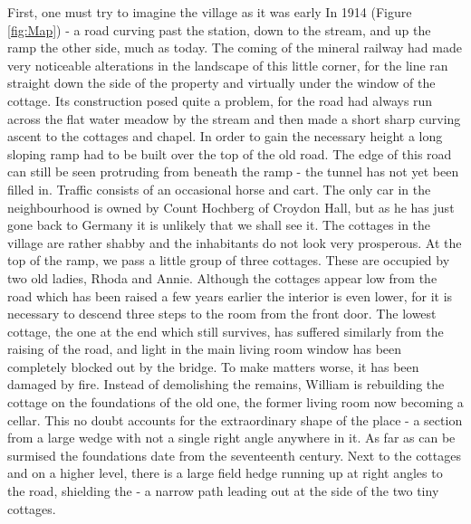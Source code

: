 
First, one must try to imagine the village as it was early In 1914 (Figure \ref{fig:Map}) - a road curving past the station, down to the stream, and up the ramp the other side, much as today. The coming of the mineral railway had made very noticeable alterations in the landscape of this little corner, for the line ran straight down the side of the property and virtually under the window of the cottage. Its construction posed quite a problem, for the road had always run across the flat water meadow by the stream and then made a short sharp curving ascent to the cottages and chapel. In order to gain the necessary height a long sloping ramp had to be built over the top of the old road. The edge of this road can still be seen protruding from beneath the ramp - the tunnel has not yet been filled in. Traffic consists of an occasional horse and cart. The only car in the neighbourhood is owned by Count Hochberg of Croydon Hall, but as he has just gone back to Germany it is unlikely that we shall see it. The cottages in the village are rather shabby and the inhabitants do not look very prosperous. At the top of the ramp, we pass a little group of three cottages. These are occupied by two old ladies, Rhoda and Annie. Although the cottages appear low from the road which has been raised a few years earlier the interior is even lower, for it is necessary to descend three steps to the room from the front door. The lowest cottage, the one at the end which still survives, has suffered similarly from the raising of the road, and light in the main living room window has been completely blocked out by the bridge. To make matters worse, it has been damaged by fire. Instead of demolishing the remains, William is rebuilding the cottage on the foundations of the old one, the former living room now becoming a cellar. This no doubt accounts for the extraordinary shape of the place - a section from a large wedge with not a single right angle anywhere in it. As far as can be surmised the foundations date from the seventeenth century. Next to the cottages and on a higher level, there is a large field hedge running up at right angles to the road, shielding the  - a narrow path leading out at the side of the two tiny cottages.

